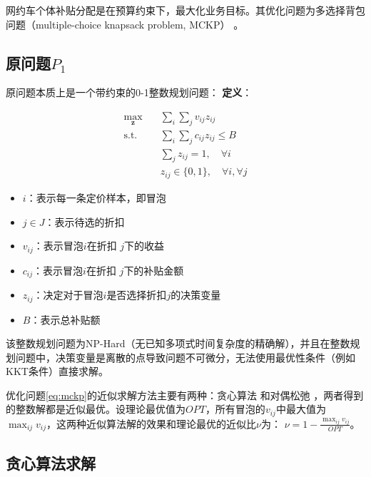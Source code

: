 网约车个体补贴分配是在预算约束下，最大化业务目标。其优化问题为多选择背包问题（multiple-choice knapsack problem, MCKP）\citep{boyd2004convex}
。\subsection{原问题$P_1$}
原问题本质上是一个带约束的0-1整数规划问题：
\textbf{定义}：

\begin{equation} \label{eq:mckp}
\begin{aligned}
\max_{\bm{z}} \quad & \sum_{i} \sum_{j} v_{ij} z_{ij} \\
\text{s.t.} \quad & \sum_{i}\sum_{j} c_{ij} z_{ij} \le B  \\
& \sum_{j} z_{ij} = 1, \quad \forall i \\
& z_{ij} \in \{0, 1\}, \quad\forall i,\forall j
\end{aligned}
\end{equation}
\begin{itemize}
    \item $i$：表示每一条定价样本，即冒泡
    \item $j \in J$：表示待选的折扣
    \item $v_{ij}$：表示冒泡$i$在折扣 $j$下的收益
    \item $c_{ij}$：表示冒泡$i$在折扣 $j$下的补贴金额
    \item $z_{ij}$：决定对于冒泡$i$是否选择折扣$j$的决策变量
    \item $B$：表示总补贴额
\end{itemize}

\par
该整数规划问题为NP-Hard（无已知多项式时间复杂度的精确解），并且在整数规划问题中，决策变量是离散的点导致问题不可微分，无法使用最优性条件（例如KKT条件）直接求解\citep{hartmanis1982computers}。\par
优化问题\eqref{eq:mckp}的近似求解方法主要有两种：贪心算法 \citep{sinha1979multiple}和对偶松弛 \citep{fisher1981lagrangian}，两者得到的整数解都是近似最优。设理论最优值为$OPT$，所有冒泡的$v_{ij}$中最大值为$\max_{ij}v_{ij}$，这两种近似算法\citep{sinha1979multiple, fisher1981lagrangian}解的效果和理论最优的近似比$\nu$为：
$\nu = 1-\frac{\max_{ij}v_{ij}}{OPT}$。



\subsection{贪心算法求解\citep{sinha1979multiple}}

